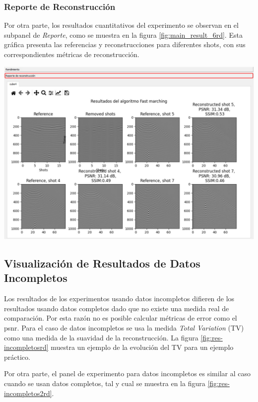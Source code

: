 \documentclass[12pt,twoside,letter]{ol-softwaremanual}
\newenvironment{Figure}
  {\par\medskip\noindent\minipage{\linewidth}}
  {\endminipage\par\medskip}
\begin{document}
\subsubsection*{Reporte de Reconstrucción}

Por otra parte, los resultados cuantitativos del experimento se observan en el subpanel de \emph{Reporte}, como se muestra en la figura \ref{fig:main_result_6rd}. Esta gráfica presenta las referencias y reconstrucciones para diferentes shots, con sus correspondientes métricas de reconstrucción.

\begin{Figure}
	\centering
	\includegraphics[width=1\linewidth]{rendrd2}
	\label{fig:main_result_6rd}
\end{Figure}

\subsection{Visualización de Resultados de Datos Incompletos}

Los resultados de los experimentos usando datos incompletos difieren de los resultados usando datos completos dado que no existe una medida real de comparación. Por esta razón no es posible calcular métricas de error como el psnr. Para el caso de datos incompletos se usa la medida \textit{Total Variation} (TV) como una medida de la suavidad de la reconstrucción. La figura \ref{fig:res-incompletosrd} muestra un ejemplo de la evolución del TV para un ejemplo práctico.

Por otra parte, el panel de experimento para datos incompletos es similar al caso cuando se usan datos completos, tal y cual se muestra en la figura \ref{fig:res-incompletos2rd}.
\end{document}
